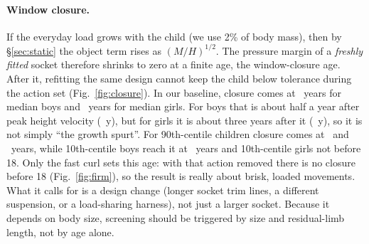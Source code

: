 \documentclass[11pt]{article}
\begin{document}
\paragraph{Window closure.} If the everyday load grows with the child (we use 2\% of body mass), then by \S\ref{sec:static} the object term rises as $(M/H)^{1/2}$. The pressure margin of a \emph{freshly fitted} socket therefore shrinks to zero at a finite age, the window-closure age. After it, refitting the same design cannot keep the child below tolerance during the action set (Fig.~\ref{fig:closure}). In our baseline, closure comes at \closureBoy\ years for median boys and \closureGirl\ years for median girls. For boys that is about half a year after peak height velocity (\phvAgeBoy\ y), but for girls it is about three years after it (\phvAgeGirl\ y), so it is not simply ``the growth spurt''. For 90th-centile children closure comes at \closureBoyNinety\ and \closureGirlNinety\ years, while 10th-centile boys reach it at \closureBoyTen\ years and 10th-centile girls not before 18. Only the fast curl sets this age: with that action removed there is no closure before 18 (Fig.~\ref{fig:firm}), so the result is really about brisk, loaded movements. What it calls for is a design change (longer socket trim lines, a different suspension, or a load-sharing harness), not just a larger socket. Because it depends on body size, screening should be triggered by size and residual-limb length, not by age alone.
\end{document}
